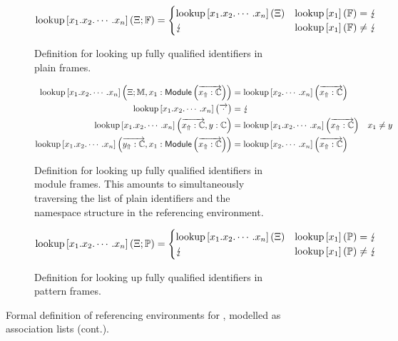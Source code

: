 \begin{figure}\ContinuedFloat
\begin{subfigure}{\linewidth}
\begin{equation*}
\operatorname{lookup}\left[x_1.x_2.\cdots.x_n\right]\left(\Xi; \mathbb{F}\right) =
\begin{cases}
\operatorname{lookup}\left[x_1.x_2.\cdots.x_n\right]\left(\Xi\right) & \operatorname{lookup}\left[x_1\right]\left(\mathbb{F}\right) = \lightning\\
\lightning & \operatorname{lookup}\left[x_1\right]\left(\mathbb{F}\right) \neq \lightning
\end{cases}
\end{equation*}
\caption{%
Definition for looking up fully qualified identifiers in plain frames.
}
\end{subfigure}
\begin{subfigure}{\linewidth}
\begin{equation*}
\begin{aligned}
\operatorname{lookup}\left[x_1.x_2.\cdots.x_n\right]\left(\Xi; \mathbb{M}, x_1 : \mathsf{Module}\left(\overrightarrow{x_\Uparrow:\mathbb{C}}\right)\right) &= \operatorname{lookup}\left[x_2.\cdots.x_n\right]\left(\overrightarrow{x_\Uparrow:\mathbb{C}}\right)\\
\operatorname{lookup}\left[x_1.x_2.\cdots.x_n\right]\left(\overrightarrow{\cdot}\right) &= \lightning\\
\operatorname{lookup}\left[x_1.x_2.\cdots.x_n\right]\left(\overrightarrow{x_\Uparrow:\mathbb{C}}, y : \mathbb{C}\right) &= \operatorname{lookup}\left[x_1.x_2.\cdots.x_n\right]\left(\overrightarrow{x_\Uparrow:\mathbb{C}}\right) & x_1 \neq y\\
\operatorname{lookup}\left[x_1.x_2.\cdots.x_n\right]\left(\overrightarrow{y_\Uparrow:\mathbb{C}}, x_1: \mathsf{Module}\left(\overrightarrow{x_\Uparrow:\mathbb{C}}\right)\right) &= \operatorname{lookup}\left[x_2.\cdots.x_n\right]\left(\overrightarrow{x_\Uparrow:\mathbb{C}}\right)
\end{aligned}
\end{equation*}
\caption{%
Definition for looking up fully qualified identifiers in module frames.
This amounts to simultaneously traversing the list of plain identifiers and the namespace structure in the referencing environment.
}
\end{subfigure}
\par\bigskip
\begin{subfigure}{\linewidth}
\begin{equation*}
\operatorname{lookup}\left[x_1.x_2.\cdots.x_n\right]\left(\Xi; \mathbb{P}\right) =
\begin{cases}
\operatorname{lookup}\left[x_1.x_2.\cdots.x_n\right]\left(\Xi\right) & \operatorname{lookup}\left[x_1\right]\left(\mathbb{P}\right) = \lightning\\
\lightning & \operatorname{lookup}\left[x_1\right]\left(\mathbb{P}\right) \neq \lightning
\end{cases}
\end{equation*}
\caption{%
Definition for looking up fully qualified identifiers in pattern frames.
}
\end{subfigure}
\caption[]{%
Formal definition of referencing environments for \Beluga, modelled as association lists (cont.).
}
\end{figure}

